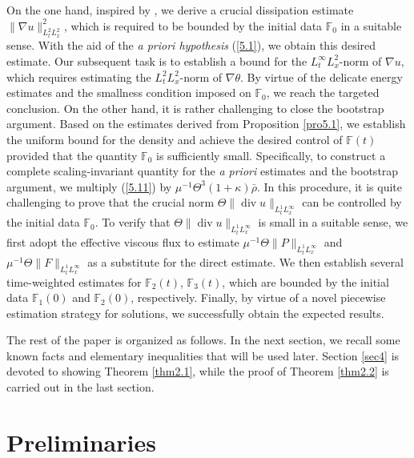 \documentclass[11pt]{article}
\DeclareMathOperator{\divv}{div}
\newcommand{\na}{\nabla}
\begin{document}
On the one hand, inspired by \cite{Li2020,W2025}, we derive a crucial dissipation estimate $\|\nabla u\|_{L^2_t L^2_x}^2$, which is required to be bounded by the initial data $\mathbb{F}_0$ in a suitable sense.
With the aid of the {\it a priori hypothesis} (\ref{5.1}), we obtain this desired estimate. Our subsequent task is to establish a bound for the $L^{\infty}_t L^2_x$-norm of $\na u$, which requires estimating the $L^2_t L^2_x$-norm of $\na \theta$.
By virtue of the delicate energy estimates and the smallness condition imposed on $\mathbb{F}_0$, we reach the targeted conclusion.
On the other hand, it is rather challenging to close the bootstrap argument.
Based on the estimates derived from Proposition \ref{pro5.1}, we establish the uniform bound for the density and achieve the desired control of $\mathbb{F} (t)$ provided that the quantity $\mathbb{F}_0$ is sufficiently small.
Specifically, to construct a complete scaling-invariant quantity for the {\it a priori} estimates and the bootstrap argument, we multiply (\ref{5.11}) by $\mu^{-1} \Theta^3 \left(1 + \kappa \right) \bar{\rho}$. In this procedure, it is quite challenging to prove that the crucial norm $\Theta \|\divv u\|_{L^1_t L^{\infty}_x} $ can be controlled by the initial data $\mathbb{F}_0$. To verify that $\Theta \|\divv u\|_{L^1_t L^{\infty}_x} $ is small in a suitable sense, we first adopt the effective viscous flux to estimate $\mu^{-1} \Theta \|P\|_{L^1_t L^{\infty}_x} $ and $\mu^{-1} \Theta \|F\|_{L^1_t L^{\infty}_x}$ as a substitute for the direct estimate. We then establish several time-weighted estimates for $\mathbb{F}_2 (t)$, $\mathbb{F}_3 (t)$, which are bounded by the initial data $\mathbb{F}_1 (0)$ and $\mathbb{F}_2 (0)$, respectively. Finally, by virtue of a novel piecewise estimation strategy for solutions, we successfully obtain the expected results.

The rest of the paper is organized as follows. In the next section, we recall some known facts and elementary inequalities that will be used later. Section \ref{sec4} is devoted to showing Theorem \ref{thm2.1}, while the proof of Theorem \ref{thm2.2} is carried out in the last section.

\section{Preliminaries}\label{sec3}
\end{document}

